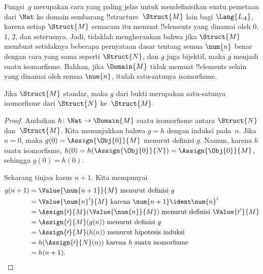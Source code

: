 \documentclass[../../../include/open-logic-section]{subfiles}
\begin{document}
\begin{explain}
Fungsi~$g$ merupakan cara yang paling jelas untuk mendefinisikan suatu
pemetaan dari $\Nat$ ke domain sembarang !!{structure}~$\Struct{M}$ lain bagi
$\Lang{L_A}$, karena setiap $\Struct{M}$ semacam itu memuat !!{element}s yang
dinamai oleh $\num{0}$, $\num{1}$, $\num{2}$, dan seterusnya. Jadi, tidaklah
mengherankan bahwa jika $\Struct{M}$ membuat setidaknya beberapa pernyataan
dasar tentang semua $\num{n}$ benar dengan cara yang sama seperti
$\Struct{N}$, dan $g$ juga bijektif, maka $g$ menjadi suatu isomorfisme.
Bahkan, jika $\Domain{M}$ tidak memuat !!{element}s selain yang dinamai oleh
semua $\num{n}$, itulah satu-satunya isomorfisme.
\end{explain}

\begin{prop}
 Jika $\Struct{M}$ standar, maka $g$ dari bukti
 merupakan satu-satunya isomorfisme dari $\Struct{N}$
ke~$\Struct{M}$.
\end{prop}

\begin{proof}
Andaikan $h\colon \Nat \to \Domain{M}$ suatu isomorfisme antara
$\Struct{N}$ dan~$\Struct{M}$. Kita menunjukkan bahwa $g = h$ dengan induksi
pada~$n$. Jika $n = 0$, maka $g(0) = \Assign{\Obj{0}}{M}$ menurut definisi
$g$. Namun, karena $h$ suatu isomorfisme,
$h(0) = h(\Assign{\Obj{0}}{N}) =\Assign{\Obj{0}}{M}$, sehingga
$g(0) = h(0)$.

Sekarang tinjau kasus $n+1$. Kita mempunyai
\begin{align*}
  g(n+1) & = \Value{\num{n+1}}{M} \text{ menurut definisi~$g$}\\
  & = \Value{\num{n}'}{M} \text{ karena $\num{n+1}\ident \num{n}'$}\\
  & = \Assign{\prime}{M}(\Value{\num{n}}{M})
    \text{ menurut definisi $\Value{t'}{M}$}\\
  & = \Assign{\prime}{M}(g(n))  \text{ menurut definisi~$g$}\\
  & = \Assign{\prime}{M}(h(n)) \text{ menurut hipotesis induksi}\\
  & = h(\Assign{\prime}{N}(n)) \text{ karena $h$ suatu isomorfisme}\\
  & = h(n+1).
\end{align*}
\end{proof}
\end{document}
